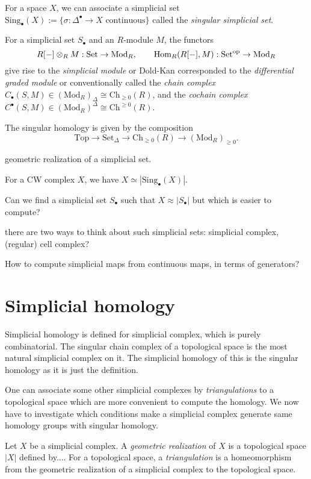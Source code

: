 \documentclass{../../large}
\begin{document}
For a space $X$, we can associate a simplicial set $\mathrm{Sing}_\bullet(X):=\{\sigma:\Delta^\bullet\to X\text{ continuous}\}$ called the \emph{singular simplicial set}.

For a simplicial set $S_\bullet$ and an $R$-module $M$, the functors
\[R[-]\otimes_RM:\mathrm{Set}\to\mathrm{Mod}_R,\qquad\operatorname{Hom}_R(R[-],M):\mathrm{Set}^{\mathrm{op}}\to\mathrm{Mod}_R\]
give rise to the \emph{simplicial module} or Dold-Kan corresponded to the \emph{differential graded module} or conventionally called the \emph{chain complex} $C_\bullet(S,M)\in(\mathrm{Mod}_R)_\Delta\cong\mathrm{Ch}_{\ge0}(R)$, and the \emph{cochain complex} $C^\bullet(S,M)\in(\mathrm{Mod}_R)^\Delta\cong\mathrm{Ch}^{\ge0}(R)$.

The singular homology is given by the composition
\[\mathrm{Top}\to\mathrm{Set}_\Delta\to\mathrm{Ch}_{\ge0}(R)\to(\mathrm{Mod}_R)_{\ge0}.\]



geometric realization of a simplicial set.

For a CW complex $X$, we have $X\simeq|\mathrm{Sing}_\bullet(X)|$.

Can we find a simplicial set $S_\bullet$ such that $X\approx|S_\bullet|$ but which is easier to compute?

there are two ways to think about such simplicial sets: simplicial complex, (regular) cell complex?



How to compute simplicial maps from continuous maps, in terms of generators?

\section{Simplicial homology}



Simplicial homology is defined for simplicial complex, which is purely combinatorial.
The singular chain complex of a topological space is the most natural simplicial complex on it.
The simplicial homology of this is the singular homology as it is just the definition.

One can associate some other simplicial complexes by \emph{triangulations} to a topological space which are more convenient to compute the homology.
We now have to investigate which conditions make a simplicial complex generate same homology groups with singular homology.

Let $X$ be a simplicial complex.
A \emph{geometric realization} of $X$ is a topological space $|X|$ defined by....
For a topological space, a \emph{triangulation} is a homeomorphism from the geometric realization of a simplicial complex to the topological space.
\end{document}
